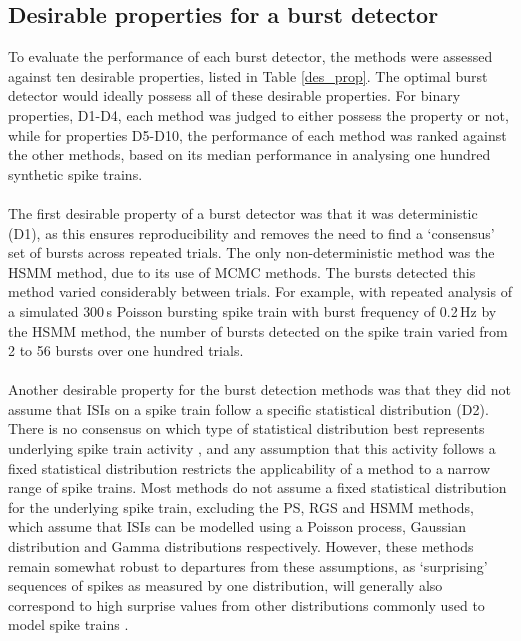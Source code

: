 \documentclass[12pt, titlepage]{article}
\begin{document}
	\subsection*{Desirable properties for a burst detector}
	To evaluate the performance of each burst detector, the methods were assessed against ten desirable properties, listed in Table \ref{des_prop}. The optimal burst detector would ideally possess all of these desirable properties. For binary properties, D1-D4, each method was judged to either possess the property or not, while for properties D5-D10, the performance of each method was ranked against the other methods, based on its median performance in analysing one hundred synthetic spike trains. 
	\\ \\ The first desirable property of a burst detector was that it was deterministic (D1), as this ensures reproducibility and removes the need to find a `consensus' set of bursts across repeated trials. The only non-deterministic method was the HSMM method, due to its use of MCMC methods. The bursts detected this method varied considerably between trials. For example, with repeated analysis of a simulated $300\,$s Poisson bursting spike train with burst frequency of 0.2$\,$Hz by the HSMM method, the number of bursts detected on the spike train varied from 2 to 56 bursts over one hundred trials. 
	\\ \\ Another desirable property for the burst detection methods was that they did not assume that ISIs on a spike train follow a specific statistical distribution (D2). There is no consensus on which type of statistical distribution best represents underlying spike train activity%
	, and any assumption that this activity follows a fixed statistical distribution restricts the applicability of a method to a narrow range of spike trains. Most methods do not assume a fixed statistical distribution for the underlying spike train, excluding the PS, RGS and HSMM methods, which assume that ISIs can be modelled using a Poisson process, Gaussian distribution and Gamma distributions respectively. However, these methods remain somewhat robust to departures from these assumptions, as `surprising' sequences of spikes as measured by one distribution, will generally also correspond to high surprise values from other distributions commonly used to model spike trains \cite{Legendy1985}. 
\end{document}
